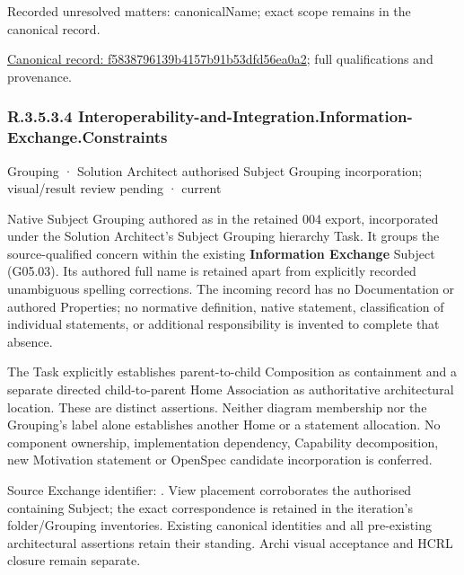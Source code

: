 {\small Recorded unresolved matters: canonicalName; exact scope remains in the canonical record.}\par
{\footnotesize \href{../../../../continuum/grouping/f5838796139b4157b91b53dfd56ea0a2.md}{Canonical record: f5838796139b4157b91b53dfd56ea0a2}; full qualifications and provenance.}\par
\subsubsection*{R.3.5.3.4 Interoperability-and-Integration.Information-Exchange.Constraints}
\label{navigation:R.3.5.3.4}

\label{element:4df45b11a8c64144acea7c240a2c93d1}
{\small Grouping · Solution Architect authorised Subject Grouping incorporation; visual/result review pending · current}\par

Native Subject Grouping authored as \texttt{} in the retained 004 export,
incorporated under the Solution Architect's Subject Grouping hierarchy Task.
It groups the source-qualified \texttt{} concern within
the existing \textbf{Information Exchange} Subject (G05.03). Its authored full name
is retained apart from explicitly recorded unambiguous spelling corrections.
The incoming record has no Documentation or authored Properties; no normative
definition, native statement, classification of individual statements, or
additional responsibility is invented to complete that absence.



The Task explicitly establishes parent-to-child Composition as containment and
a separate directed child-to-parent Home Association as authoritative architectural
location. These are distinct assertions. Neither diagram membership nor the
Grouping's label alone establishes another Home or a statement allocation.
No component ownership, implementation dependency, Capability decomposition,
new Motivation statement or OpenSpec candidate incorporation is conferred.



Source Exchange identifier: \texttt{}. View placement corroborates
the authorised containing Subject; the exact correspondence is retained in the
iteration's folder/Grouping inventories. Existing canonical identities and all
pre-existing architectural assertions retain their standing. Archi visual
acceptance and HCRL closure remain separate.


